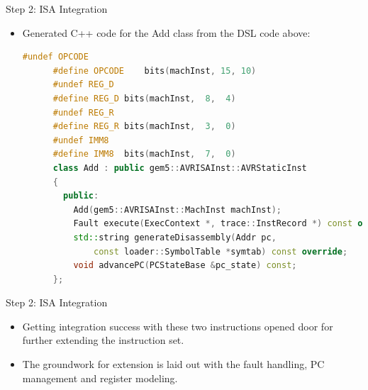 \begin{frame}[fragile]{Step 2: ISA Integration}
  \begin{itemize}
    \item Generated C++ code for the Add class from the DSL code above:
    \begin{lstlisting}[language=C++]
      #undef OPCODE
      #define OPCODE	bits(machInst, 15, 10)
      #undef REG_D
      #define REG_D	bits(machInst,  8,  4)
      #undef REG_R
      #define REG_R	bits(machInst,  3,  0)
      #undef IMM8
      #define IMM8	bits(machInst,  7,  0)
      class Add : public gem5::AVRISAInst::AVRStaticInst
      {
        public:
          Add(gem5::AVRISAInst::MachInst machInst);
          Fault execute(ExecContext *, trace::InstRecord *) const override;
          std::string generateDisassembly(Addr pc,
              const loader::SymbolTable *symtab) const override;
          void advancePC(PCStateBase &pc_state) const;
      };
    \end{lstlisting}
  \end{itemize}
\end{frame}


\begin{frame}{Step 2: ISA Integration}
  \begin{itemize}
    \item Getting integration success with these two instructions opened door for further extending the instruction set.
    \item The groundwork for extension is laid out with the fault handling, PC management and register modeling. 
  \end{itemize}
\end{frame}